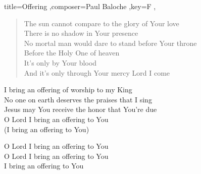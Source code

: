 \documentclass[]{leadsheet}
\begin{document}
\begin{song}{title={Offering
},composer={Paul Baloche
},key={F
},}
\begin{verse}
The sun cannot compare to the glory of Your love \\
There is no shadow in Your presence \\
No mortal man would dare to stand before Your throne \\
Before the Holy One of heaven \\
It's only by Your blood \\
And it's only through Your mercy Lord I come \\
\end{verse}

\begin{chorus}
I bring an offering of worship to my King \\
No one on earth deserves the praises that I sing \\
Jesus may You receive the honor that You're due \\
O Lord I bring an offering to You \\
(I bring an offering to You) \\
\end{chorus}

\begin{outro}
O Lord I bring an offering to You \\
O Lord I bring an offering to You \\
I bring an offering to You \\
\end{outro}

\end{song}
\end{document}
